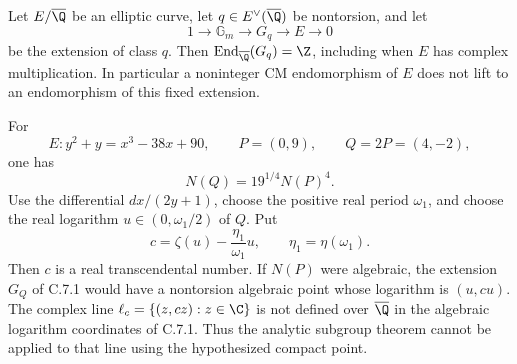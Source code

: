 \begin{statement}
Let $E/\overline\Q$ be an elliptic curve, let
$q\in E^\vee(\overline\Q)$ be nontorsion, and let
\[
 1\longrightarrow\mathbb G_m\longrightarrow G_q
       \longrightarrow E\longrightarrow0
\]
be the extension of class $q$. Then
$\operatorname{End}_{\overline\Q}(G_q)=\Z$, including when
$E$ has complex multiplication. In particular a noninteger
CM endomorphism of $E$ does not lift to an endomorphism of this
fixed extension.

For
\[
 E:y^2+y=x^3-38x+90,\qquad P=(0,9),\qquad Q=2P=(4,-2),
\]
one has
\[
 N(Q)=19^{1/4}N(P)^4.
\]
Use the differential $dx/(2y+1)$, choose the positive real
period $\omega_1$, and choose the real logarithm
$u\in(0,\omega_1/2)$ of $Q$. Put
\begin{equation}\label{eq:cd-slope}
 c=\zeta(u)-\frac{\eta_1}{\omega_1}u,
 \qquad \eta_1=\eta(\omega_1).
\end{equation}
Then $c$ is a real transcendental number. If $N(P)$ were
algebraic, the extension $G_Q$ of C.7.1 would have a
nontorsion algebraic point whose logarithm is $(u,cu)$.
The complex line
$\ell_c=\{(z,cz):z\in\C\}$ is not defined over
$\overline\Q$ in the algebraic logarithm coordinates of
C.7.1. Thus the analytic subgroup theorem cannot be applied
to that line using the hypothesized compact point.
\end{statement}
